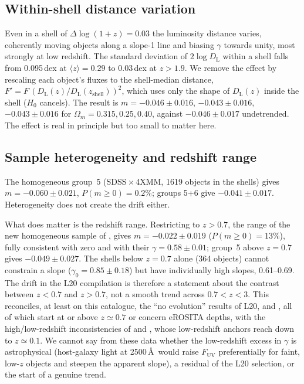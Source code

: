 \documentclass[twocolumn,10pt]{article}
\newcommand{\FUV}{F_{\mathrm{UV}}}
\newcommand{\DL}{D_{\mathrm{L}}}
\begin{document}
\subsection{Within-shell distance variation}
Even in a shell of $\Delta\log(1+z)=0.03$ the luminosity distance varies, coherently moving objects along a slope-1 line and biasing $\gamma$ towards unity, most strongly at low redshift. The standard deviation of $2\log\DL$ within a shell falls from 0.095\,dex at $\langle z\rangle=0.29$ to 0.03\,dex at $z>1.9$. We remove the effect by rescaling each object's fluxes to the shell-median distance, $F'=F\,(\DL(z)/\DL(z_{\mathrm{shell}}))^2$, which uses only the shape of $\DL(z)$ inside the shell ($H_0$ cancels). The result is $m=-0.046\pm0.016$, $-0.043\pm0.016$, $-0.043\pm0.016$ for $\Omega_m=0.315, 0.25, 0.40$, against $-0.046\pm0.017$ undetrended. The effect is real in principle but too small to matter here.

\subsection{Sample heterogeneity and redshift range}
The homogeneous group~5 (SDSS\,$\times$\,4XMM, 1619 objects in the shells) gives $m=-0.060\pm0.021$, $P(m\ge0)=0.2\%$; groups 5+6 give $-0.041\pm0.017$. Heterogeneity does not create the drift either.

What does matter is the redshift range. Restricting to $z>0.7$, the range of the new homogeneous sample of \citet{risaliti26}, gives $m=-0.022\pm0.019$ ($P(m\ge0)=13\%$), fully consistent with zero and with their $\gamma=0.58\pm0.01$; group~5 above $z=0.7$ gives $-0.049\pm0.027$. The shells below $z=0.7$ alone (364 objects) cannot constrain a slope ($\gamma_0=0.85\pm0.18$) but have individually high slopes, 0.61--0.69. The drift in the L20 compilation is therefore a statement about the contrast between $z<0.7$ and $z>0.7$, not a smooth trend across $0.7<z<3$. This reconciles, at least on this catalogue, the ``no evolution'' results of L20, \citet{sacchi25} and \citet{risaliti26}, all of which start at or above $z\simeq0.7$ or concern eROSITA depths, with the high/low-redshift inconsistencies of \citet{khadka21} and \citet{li25}, whose low-redshift anchors reach down to $z\simeq0.1$. We cannot say from these data whether the low-redshift excess in $\gamma$ is astrophysical (host-galaxy light at 2500\,\AA\ would raise $\FUV$ preferentially for faint, low-$z$ objects and steepen the apparent slope), a residual of the L20 selection, or the start of a genuine trend.
\end{document}
